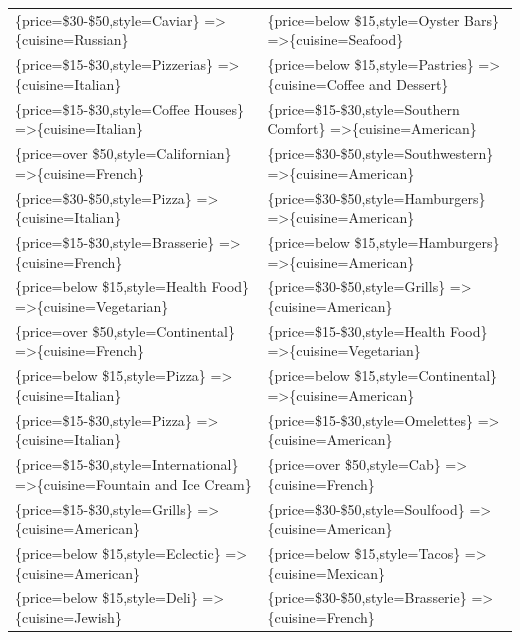 \documentclass[letterpaper,10pt]{article}
\begin{document}
\begin{appendices}
\begin{table}[h]
\begin{adjustbox}{max width=\textwidth}
\begin{tabular}{ll}
\{price=\$30-\$50,style=Caviar\} =\textgreater \{cuisine=Russian\} & \{price=below \$15,style=Oyster Bars\} =\textgreater \{cuisine=Seafood\} \\ 
\{price=\$15-\$30,style=Pizzerias\} =\textgreater \{cuisine=Italian\} & \{price=below \$15,style=Pastries\} =\textgreater \{cuisine=Coffee and Dessert\} \\ 
\{price=\$15-\$30,style=Coffee Houses\} =\textgreater \{cuisine=Italian\} & \{price=\$15-\$30,style=Southern Comfort\} =\textgreater \{cuisine=American\} \\ 
\{price=over \$50,style=Californian\} =\textgreater \{cuisine=French\} & \{price=\$30-\$50,style=Southwestern\} =\textgreater \{cuisine=American\} \\ 
\{price=\$30-\$50,style=Pizza\} =\textgreater \{cuisine=Italian\} & \{price=\$30-\$50,style=Hamburgers\} =\textgreater \{cuisine=American\} \\ 
\{price=\$15-\$30,style=Brasserie\} =\textgreater \{cuisine=French\} & \{price=below \$15,style=Hamburgers\} =\textgreater \{cuisine=American\} \\ 
\{price=below \$15,style=Health Food\} =\textgreater \{cuisine=Vegetarian\} & \{price=\$30-\$50,style=Grills\} =\textgreater \{cuisine=American\} \\ 
\{price=over \$50,style=Continental\} =\textgreater \{cuisine=French\} & \{price=\$15-\$30,style=Health Food\} =\textgreater \{cuisine=Vegetarian\} \\ 
\{price=below \$15,style=Pizza\} =\textgreater \{cuisine=Italian\} & \{price=below \$15,style=Continental\} =\textgreater \{cuisine=American\} \\ 
\{price=\$15-\$30,style=Pizza\} =\textgreater \{cuisine=Italian\} & \{price=\$15-\$30,style=Omelettes\} =\textgreater \{cuisine=American\} \\ 
\{price=\$15-\$30,style=International\} =\textgreater \{cuisine=Fountain and Ice Cream\} & \{price=over \$50,style=Cab\} =\textgreater \{cuisine=French\} \\ 
\{price=\$15-\$30,style=Grills\} =\textgreater \{cuisine=American\} & \{price=\$30-\$50,style=Soulfood\} =\textgreater \{cuisine=American\} \\ 
\{price=below \$15,style=Eclectic\} =\textgreater \{cuisine=American\} & \{price=below \$15,style=Tacos\} =\textgreater \{cuisine=Mexican\} \\ 
\{price=below \$15,style=Deli\} =\textgreater \{cuisine=Jewish\} & \{price=\$30-\$50,style=Brasserie\} =\textgreater \{cuisine=French\} \\ 

\end{tabular}
\end{adjustbox}
\end{table}
\end{appendices}
\end{document}
